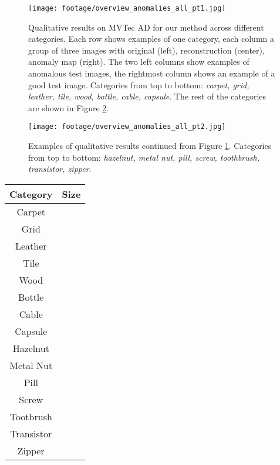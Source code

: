 \documentclass[final,5p,times,twocolumn]{elsarticle}
\begin{document}
	\begin{figure}[h]
		\centering
		\texttt{[image: footage/overview\_anomalies\_all\_pt1.jpg]}
		\caption{Qualitative results on MVTec AD for our method across different categories. Each row shows examples of one category, each column a group of three images with original (left), reconstruction (center), anomaly map (right). The two left columns show examples of anomalous test images, the rightmost column shows an example of a good test image. Categories from top to bottom: \textit{carpet, grid, leather, tile, wood, bottle, cable, capsule}. The rest of the categories are shown in Figure \ref{fig:overview_anomalies_all_pt2}.}
		\label{fig:overview_anomalies_all_pt1}
	\end{figure}
	
	\begin{figure}[h]
		\centering
		\texttt{[image: footage/overview\_anomalies\_all\_pt2.jpg]}
		\caption{Examples of qualitative results continued from Figure \ref{fig:overview_anomalies_all_pt1}. Categories from top to bottom: \textit{hazelnut, metal nut, pill, screw, toothbrush, transistor, zipper}.}
		\label{fig:overview_anomalies_all_pt2}
	\end{figure}
	
	\begin{table}[h]
		\begin{center}
			\begin{tabular}{|c c|} 
				\hline
				Category & Size \\
				\hline \hline
				Carpet &  \\
				Grid &  \\
				Leather &  \\
				Tile &  \\
				Wood &  \\
				\hline
				Bottle &  \\
				Cable &  \\
				Capsule &  \\
				Hazelnut &  \\
				Metal Nut &  \\
				Pill &  \\
				Screw &  \\
				Tootbrush &  \\
				Transistor &  \\
				Zipper &  \\
				\hline
			\end{tabular}
			\label{table:image_sizes}
		\end{center}
	\end{table}
	
\end{document}
